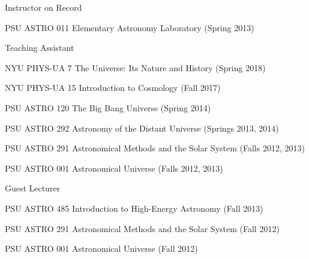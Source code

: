 \documentclass[11pt,letterpaper]{article}
\begin{document}
\begin{list}{}{\malzlist}
\item Instructor on Record
\begin{list}{}{\malzlist}
	\item PSU ASTRO 011 Elementary Astronomy Laboratory (Spring 2013)
\end{list}
\item Teaching Assistant
\begin{list}{}{\malzlist}
	\item NYU PHYS-UA 7 The Universe: Its Nature and History (Spring 2018)
	\item NYU PHYS-UA 15 Introduction to Cosmology (Fall 2017)
	\item PSU ASTRO 120 The Big Bang Universe (Spring 2014)
	\item PSU ASTRO 292 Astronomy of the Distant Universe (Springs 2013, 2014)
	\item PSU ASTRO 291 Astronomical Methods and the Solar System (Falls 2012, 2013)
	\item PSU ASTRO 001 Astronomical Universe (Falls 2012, 2013)
\end{list}
\item Guest Lecturer
\begin{list}{}{\malzlist}
	\item PSU ASTRO 485 Introduction to High-Energy Astronomy (Fall 2013)%
	\item PSU ASTRO 291 Astronomical Methods and the Solar System (Fall 2012) %
	\item PSU ASTRO 001 Astronomical Universe (Fall 2012) %
\end{list}
\end{list}
\end{document}
